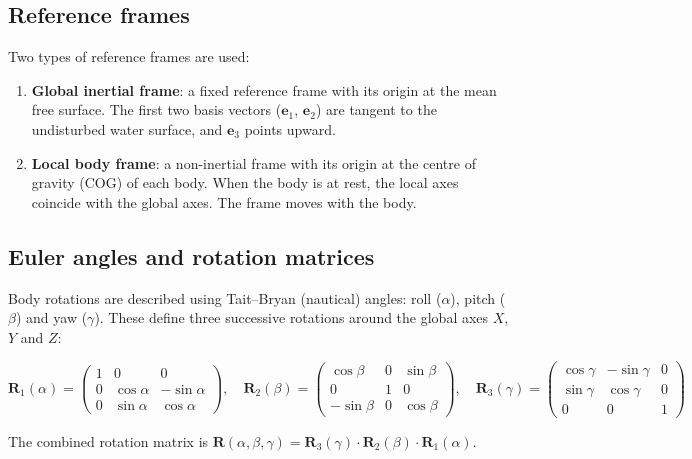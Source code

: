 \documentclass[11pt]{article}
\begin{document}
\subsection{Reference frames}

Two types of reference frames are used:

\begin{enumerate}
    \item \textbf{Global inertial frame}: a fixed reference frame with its origin at the mean free surface. The first two basis vectors ($\mathbf{e}_1$, $\mathbf{e}_2$) are tangent to the undisturbed water surface, and $\mathbf{e}_3$ points upward.
    \item \textbf{Local body frame}: a non-inertial frame with its origin at the centre of gravity (COG) of each body. When the body is at rest, the local axes coincide with the global axes. The frame moves with the body.
\end{enumerate}

\subsection{Euler angles and rotation matrices}

Body rotations are described using Tait--Bryan (nautical) angles: roll ($\alpha$), pitch ($\beta$) and yaw ($\gamma$). These define three successive rotations around the global axes $X$, $Y$ and $Z$:

\begin{equation}
\mathbf{R}_1(\alpha) = \begin{pmatrix} 1 & 0 & 0 \\ 0 & \cos\alpha & -\sin\alpha \\ 0 & \sin\alpha & \cos\alpha \end{pmatrix}, \quad
\mathbf{R}_2(\beta) = \begin{pmatrix} \cos\beta & 0 & \sin\beta \\ 0 & 1 & 0 \\ -\sin\beta & 0 & \cos\beta \end{pmatrix}, \quad
\mathbf{R}_3(\gamma) = \begin{pmatrix} \cos\gamma & -\sin\gamma & 0 \\ \sin\gamma & \cos\gamma & 0 \\ 0 & 0 & 1 \end{pmatrix}
\end{equation}

The combined rotation matrix is $\mathbf{R}(\alpha,\beta,\gamma) = \mathbf{R}_3(\gamma)\cdot\mathbf{R}_2(\beta)\cdot\mathbf{R}_1(\alpha)$.
\end{document}
